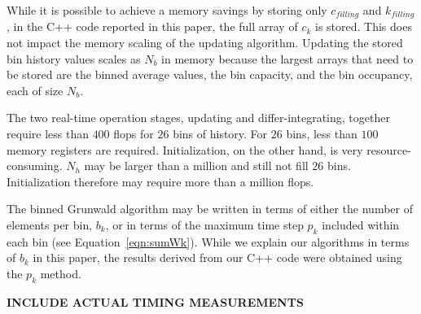 While it is possible to achieve a memory savings by storing only
$c_{filling}$ and $k_{filling}$, in the C++ code reported in this
paper, the full array of $c_{k}$ is stored. This does not impact the
memory scaling of the updating algorithm. Updating the stored bin
history values scales as $N_b$ in memory because the largest arrays
that need to be stored are the binned average values, the bin
capacity, and the bin occupancy, each of size $N_b$.

The two real-time operation stages, updating and differ-integrating,
together require less than $400$ flops for $26$ bins of
history. For $26$ bins, less than $100$ memory registers are
required. Initialization, on the other hand, is very
resource-consuming. $N_h$ may be larger than a million and still not
fill $26$ bins. Initialization therefore may require more than a
million flops.

The binned Grunwald algorithm may be written in terms of either the
number of elements per bin, $b_k$, or in terms of the maximum time
step $p_k$ included within each bin (see
Equation~\ref{eqn:sumWk}). While we explain our algorithms in terms of
$b_k$ in this paper, the results derived from our C++ code were
obtained using the $p_k$ method.

{\bf INCLUDE ACTUAL TIMING MEASUREMENTS}
